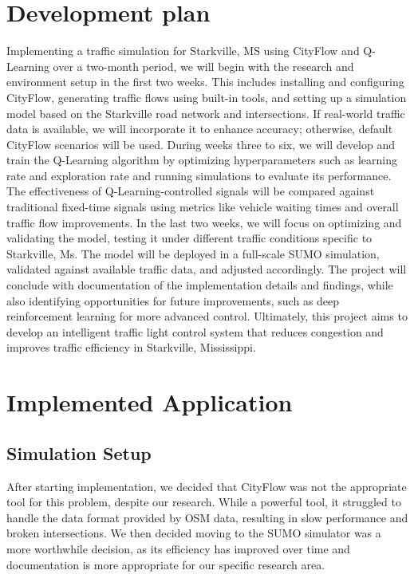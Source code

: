 \documentclass[conference]{IEEEtran}
\begin{document}
\section{Development plan}

Implementing a traffic simulation for Starkville, MS using CityFlow and Q-Learning over a two-month period, we will begin with the research and environment setup in the first two weeks. This includes installing and configuring CityFlow, generating traffic flows using built-in tools, and setting up a simulation model based on the Starkville road network and intersections. If real-world traffic data is available, we will incorporate it to enhance accuracy; otherwise, default CityFlow scenarios will be used. During weeks three to six, we will develop and train the Q-Learning algorithm by optimizing hyperparameters such as learning rate and exploration rate and running simulations to evaluate its performance. The effectiveness of Q-Learning-controlled signals will be compared against traditional fixed-time signals using metrics like vehicle waiting times and overall traffic flow improvements. In the last two weeks, we will focus on optimizing and validating the model, testing it under different traffic conditions specific to Starkville, Ms. The model will be deployed in a full-scale SUMO simulation, validated against available traffic data, and adjusted accordingly. The project will conclude with documentation of the implementation details and findings, while also identifying opportunities for future improvements, such as deep reinforcement learning for more advanced control. Ultimately, this project aims to develop an intelligent traffic light control system that reduces congestion and improves traffic efficiency in Starkville, Mississippi.

\section{Implemented Application}

\subsection{Simulation Setup}

After starting implementation, we decided that CityFlow was not the appropriate tool for this problem, despite our research. While a powerful tool, it struggled to handle the data format provided by OSM data, resulting in slow performance and broken intersections. We then decided moving to the SUMO simulator was a more worthwhile decision, as its efficiency has improved over time and documentation is more appropriate for our specific research area. 
\end{document}
